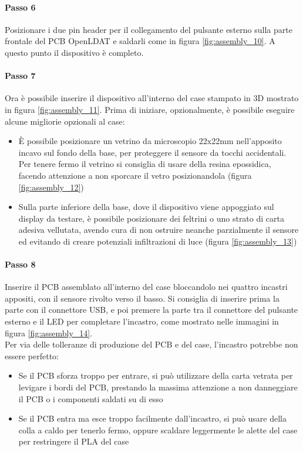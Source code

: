 \paragraph{Passo 6} Posizionare i due pin header per il collegamento del pulsante esterno sulla parte frontale del PCB OpenLDAT e saldarli come in figura \ref{fig:assembly_10}. A questo punto il dispositivo è completo.

\paragraph{Passo 7} Ora è possibile inserire il dispositivo all'interno del case stampato in 3D mostrato in figura \ref{fig:assembly_11}. Prima di iniziare, opzionalmente, è possibile eseguire alcune migliorie opzionali al case:
\begin{itemize}
	\item È possibile posizionare un vetrino da microscopio 22x22mm nell'apposito incavo sul fondo della base, per proteggere il sensore da tocchi accidentali. Per tenere fermo il vetrino si consiglia di usare della resina epossidica, facendo attenzione a non sporcare il vetro posizionandola (figura \ref{fig:assembly_12})
	\item Sulla parte inferiore della base, dove il dispositivo viene appoggiato sul display da testare, è possibile posizionare dei feltrini o uno strato di carta adesiva vellutata, avendo cura di non ostruire neanche parzialmente il sensore ed evitando di creare potenziali infiltrazioni di luce (figura \ref{fig:assembly_13})
\end{itemize}

\paragraph{Passo 8} Inserire il PCB assemblato all'interno del case bloccandolo nei quattro incastri appositi, con il sensore rivolto verso il basso. Si consiglia di inserire prima la parte con il connettore USB, e poi premere la parte tra il connettore del pulsante esterno e il LED per completare l'incastro, come mostrato nelle immagini in figura \ref{fig:assembly_14}.\\
Per via delle tolleranze di produzione del PCB e del case, l'incastro potrebbe non essere perfetto:\begin{itemize}
	\item Se il PCB sforza troppo per entrare, si può utilizzare della carta vetrata per levigare i bordi del PCB, prestando la massima attenzione a non danneggiare il PCB o i componenti saldati su di esso
	\item Se il PCB entra ma esce troppo facilmente dall'incastro, si può usare della colla a caldo per tenerlo fermo, oppure scaldare leggermente le alette del case per restringere il PLA del case
\end{itemize}

